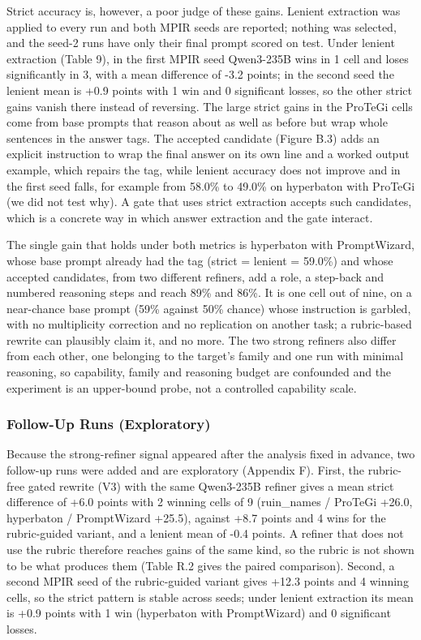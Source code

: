 \documentclass{ieeeaccess}
\begin{document}
Strict accuracy is, however, a poor judge of these gains. Lenient extraction was applied to every run and both MPIR seeds are reported; nothing was selected, and the seed-2 runs have only their final prompt scored on test. Under lenient extraction (Table 9), in the first MPIR seed Qwen3-235B wins in 1 cell and loses significantly in 3, with a mean difference of -3.2 points; in the second seed the lenient mean is +0.9 points with 1 win and 0 significant losses, so the other strict gains vanish there instead of reversing. The large strict gains in the ProTeGi cells come from base prompts that reason about as well as before but wrap whole sentences in the answer tags. The accepted candidate (Figure B.3) adds an explicit instruction to wrap the final answer on its own line and a worked output example, which repairs the tag, while lenient accuracy does not improve and in the first seed falls, for example from 58.0\% to 49.0\% on hyperbaton with ProTeGi (we did not test why). A gate that uses strict extraction accepts such candidates, which is a concrete way in which answer extraction and the gate interact.

The single gain that holds under both metrics is hyperbaton with PromptWizard, whose base prompt already had the tag (strict = lenient = 59.0\%) and whose accepted candidates, from two different refiners, add a role, a step-back and numbered reasoning steps and reach 89\% and 86\%. It is one cell out of nine, on a near-chance base prompt (59\% against 50\% chance) whose instruction is garbled, with no multiplicity correction and no replication on another task; a rubric-based rewrite can plausibly claim it, and no more. The two strong refiners also differ from each other, one belonging to the target's family and one run with minimal reasoning, so capability, family and reasoning budget are confounded and the experiment is an upper-bound probe, not a controlled capability scale.

\subsubsection{Follow-Up Runs (Exploratory)}

Because the strong-refiner signal appeared after the analysis fixed in advance, two follow-up runs were added and are exploratory (Appendix F). First, the rubric-free gated rewrite (V3) with the same Qwen3-235B refiner gives a mean strict difference of +6.0 points with 2 winning cells of 9 (ruin\_\allowbreak{}names / ProTeGi +26.0, hyperbaton / PromptWizard +25.5), against +8.7 points and 4 wins for the rubric-guided variant, and a lenient mean of -0.4 points. A refiner that does not use the rubric therefore reaches gains of the same kind, so the rubric is not shown to be what produces them (Table R.2 gives the paired comparison). Second, a second MPIR seed of the rubric-guided variant gives +12.3 points and 4 winning cells, so the strict pattern is stable across seeds; under lenient extraction its mean is +0.9 points with 1 win (hyperbaton with PromptWizard) and 0 significant losses.
\end{document}
